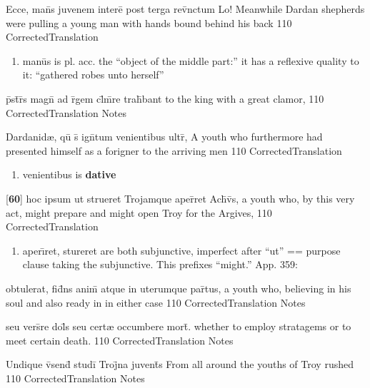 \latline
  {Ecce, man\={}s juvenem intere\={} post terga rev\={\macron {\i}}nctum}
  { Lo!  Meanwhile Dardan shepherds were pulling a young man with hands bound behind his back }
  {110}
  { CorrectedTranslation }
  { \begin{enumerate}
  	\item man\={u}s is pl. acc. the ``object of the middle part:''  it has a reflexive quality to it: ``gathered robes unto herself''
  \end{enumerate} }


\latline
  {p\={}st\={}r\={}s magn\={} ad r\={}gem cl\={}m\={}re trah\={}bant}
  { to the king with a great clamor,  }
  {110}
  { CorrectedTranslation }
  { Notes }


\latline
  {Dardanid{\ae}, qu\={\macron {\i}} s\={} ign\={}tum venientibus ultr\={},}
  { A youth who furthermore had presented himself as a forigner to the arriving men  }
  {110}
  { CorrectedTranslation }
  { \begin{enumerate}
  	\item venientibus is \textbf{dative}
  \end{enumerate} }


\latline
  {[\textbf{60}] hoc ipsum ut strueret Trojamque aper\={\macron {\i}}ret Ach\={\macron {\i}}v\={\macron {\i}}s,}
  { a youth who, by this very act, might prepare and might open Troy for the Argives, }
  {110}
  { CorrectedTranslation }
  { \begin{enumerate}
  	\item aper\={\i}ret, stureret are both subjunctive, imperfect after ``ut'' == purpose clause taking the subjunctive.  This prefixes ``might.''  App. 359: 
  \end{enumerate} }


\latline
  {obtulerat, fid\={}ns anim\={\macron {\i}} atque in uterumque par\={}tus,}
  { a youth who, believing in his soul and also ready in in either case }
  {110}
  { CorrectedTranslation }
  { Notes }


\latline
  {seu vers\={}re dol\={}s seu cert{\ae} occumbere mort\={\macron {\i}}.}
  { whether to employ stratagems or to meet certain death. }
  {110}
  { CorrectedTranslation }
  { Notes }


\latline
  {Undique v\={\macron {\i}}send\={\macron {\i}} studi\={} Troj\={}na juvent\={}s}
  { From all around the youths of Troy rushed }
  {110}
  { CorrectedTranslation }
  { Notes }


